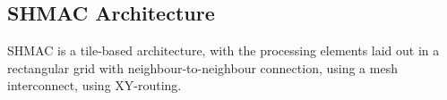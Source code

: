 \subsection{SHMAC Architecture}

SHMAC is a tile-based architecture, with the processing elements laid out in a rectangular grid with neighbour-to-neighbour connection, using a mesh interconnect, using XY-routing.

